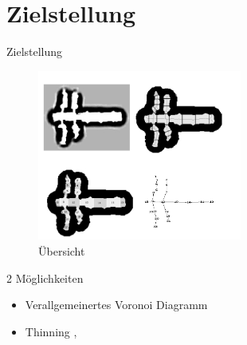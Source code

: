 \section{Zielstellung}
\begin{frame}{Zielstellung}

\begin{figure}[h]
 \centering
 \includegraphics[width=0.6\textwidth]{./material/complete.png}
 \caption{Übersicht \cite{Thrun1998}}
 \label{fig:gesamt}
\end{figure}
\end{frame}


\begin{frame}
 2 Möglichkeiten
 \begin{itemize}
  \item Verallgemeinertes Voronoi Diagramm \cite{Thrun1998}
  \item Thinning \cite{KoBangYun}, \cite{ZhangSuen}
 \end{itemize}

\end{frame}






